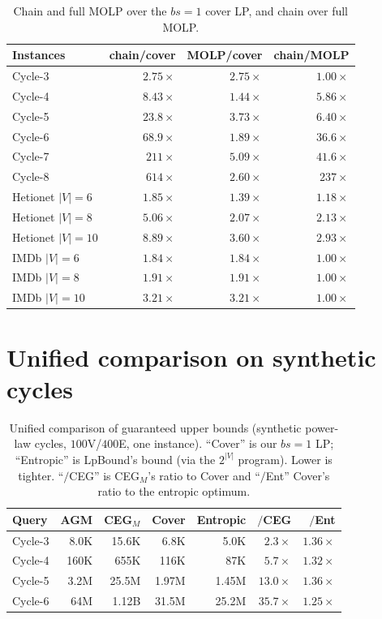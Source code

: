\documentclass[11pt]{article}
\begin{document}
\begin{table}[h]
\centering
\caption{Chain and full MOLP over the $bs{=}1$ cover LP, and chain over full MOLP.}
\label{tab:molp}
\small
\begin{tabular}{@{}lrrr@{}}
\toprule
Instances & chain/cover & MOLP/cover & chain/MOLP \\
\midrule
Cycle-3 & $2.75\times$ & $2.75\times$ & $1.00\times$ \\
Cycle-4 & $8.43\times$ & $1.44\times$ & $5.86\times$ \\
Cycle-5 & $23.8\times$ & $3.73\times$ & $6.40\times$ \\
Cycle-6 & $68.9\times$ & $1.89\times$ & $36.6\times$ \\
Cycle-7 & $211\times$ & $5.09\times$ & $41.6\times$ \\
Cycle-8 & $614\times$ & $2.60\times$ & $237\times$ \\
\midrule
Hetionet $|V|{=}6$ & $1.85\times$ & $1.39\times$ & $1.18\times$ \\
Hetionet $|V|{=}8$ & $5.06\times$ & $2.07\times$ & $2.13\times$ \\
Hetionet $|V|{=}10$ & $8.89\times$ & $3.60\times$ & $2.93\times$ \\
IMDb $|V|{=}6$ & $1.84\times$ & $1.84\times$ & $1.00\times$ \\
IMDb $|V|{=}8$ & $1.91\times$ & $1.91\times$ & $1.00\times$ \\
IMDb $|V|{=}10$ & $3.21\times$ & $3.21\times$ & $1.00\times$ \\
\bottomrule
\end{tabular}
\end{table}

\section{Unified comparison on synthetic cycles}
\begin{table}[h]
\centering
\caption{Unified comparison of guaranteed upper bounds (synthetic
power-law cycles, $100$V/$400$E, one instance). ``Cover'' is our $bs{=}1$ LP;
``Entropic'' is LpBound's bound (via the $2^{|V|}$ program). Lower is tighter.
``$/$CEG'' is CEG$_M$'s ratio to Cover and ``$/$Ent'' Cover's ratio to the
entropic optimum.}

\begin{tabular}{@{}lrrrrrr@{}}
\toprule
Query & AGM & CEG$_M$ & Cover & Entropic & $/$CEG & $/$Ent \\
\midrule
Cycle-3 & 8.0K & 15.6K & 6.8K & 5.0K & $2.3\times$ & $1.36\times$ \\
Cycle-4 & 160K & 655K & 116K & 87K & $5.7\times$ & $1.32\times$ \\
Cycle-5 & 3.2M & 25.5M & 1.97M & 1.45M & $13.0\times$ & $1.36\times$ \\
Cycle-6 & 64M & 1.12B & 31.5M & 25.2M & $35.7\times$ & $1.25\times$ \\
\bottomrule
\end{tabular}
\end{table}
\end{document}
